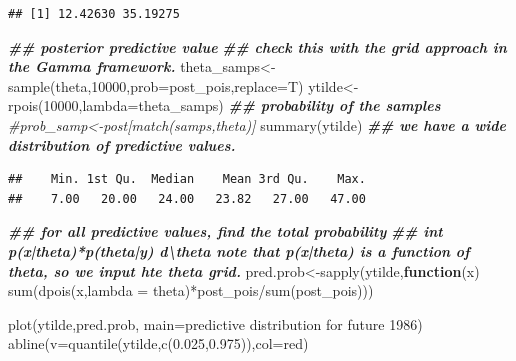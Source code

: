 \documentclass[
]{book}
\newenvironment{Shaded}{\begin{snugshade}}{\end{snugshade}}
\newcommand{\AttributeTok}[1]{\textcolor[rgb]{0.77,0.63,0.00}{#1}}
\newcommand{\CommentTok}[1]{\textcolor[rgb]{0.56,0.35,0.01}{\textit{#1}}}
\newcommand{\ControlFlowTok}[1]{\textcolor[rgb]{0.13,0.29,0.53}{\textbf{#1}}}
\newcommand{\DecValTok}[1]{\textcolor[rgb]{0.00,0.00,0.81}{#1}}
\newcommand{\DocumentationTok}[1]{\textcolor[rgb]{0.56,0.35,0.01}{\textbf{\textit{#1}}}}
\newcommand{\FloatTok}[1]{\textcolor[rgb]{0.00,0.00,0.81}{#1}}
\newcommand{\FunctionTok}[1]{\textcolor[rgb]{0.00,0.00,0.00}{#1}}
\newcommand{\NormalTok}[1]{#1}
\newcommand{\OtherTok}[1]{\textcolor[rgb]{0.56,0.35,0.01}{#1}}
\newcommand{\SpecialCharTok}[1]{\textcolor[rgb]{0.00,0.00,0.00}{#1}}
\newcommand{\StringTok}[1]{\textcolor[rgb]{0.31,0.60,0.02}{#1}}
\theoremstyle{definition}
\theoremstyle{definition}
\theoremstyle{definition}
\theoremstyle{definition}
\theoremstyle{remark}
\begin{document}
\begin{verbatim}
## [1] 12.42630 35.19275
\end{verbatim}

\begin{Shaded}
\begin{Highlighting}[]
\DocumentationTok{\#\# posterior predictive value}
   \DocumentationTok{\#\# check this with the grid approach in the Gamma framework.  }
\NormalTok{  theta\_samps}\OtherTok{\textless{}{-}}\FunctionTok{sample}\NormalTok{(theta,}\DecValTok{10000}\NormalTok{,}\AttributeTok{prob=}\NormalTok{post\_pois,}\AttributeTok{replace=}\NormalTok{T)}
\NormalTok{   ytilde}\OtherTok{\textless{}{-}}\FunctionTok{rpois}\NormalTok{(}\DecValTok{10000}\NormalTok{,}\AttributeTok{lambda=}\NormalTok{theta\_samps) }
 \DocumentationTok{\#\# probability of the samples }
 \CommentTok{\#prob\_samp\textless{}{-}post[match(samps,theta)]}
  \FunctionTok{summary}\NormalTok{(ytilde) }\DocumentationTok{\#\# we have a wide distribution of predictive values.}
\end{Highlighting}
\end{Shaded}

\begin{verbatim}
##    Min. 1st Qu.  Median    Mean 3rd Qu.    Max. 
##    7.00   20.00   24.00   23.82   27.00   47.00
\end{verbatim}

\begin{Shaded}
\begin{Highlighting}[]
\DocumentationTok{\#\# for all predictive values,  find the total probability  }
   \DocumentationTok{\#\# int p(x|theta)*p(theta|y) d\textbackslash{}theta  note that p(x|theta) is a function of theta, so we input hte theta grid.}
\NormalTok{ pred.prob}\OtherTok{\textless{}{-}}\FunctionTok{sapply}\NormalTok{(ytilde,}\ControlFlowTok{function}\NormalTok{(x) }\FunctionTok{sum}\NormalTok{(}\FunctionTok{dpois}\NormalTok{(x,}\AttributeTok{lambda =}\NormalTok{ theta)}\SpecialCharTok{*}\NormalTok{post\_pois}\SpecialCharTok{/}\FunctionTok{sum}\NormalTok{(post\_pois)))  }
  
 \FunctionTok{plot}\NormalTok{(ytilde,pred.prob, }\AttributeTok{main=}\StringTok{\textquotesingle{}predictive distribution for future 1986\textquotesingle{}}\NormalTok{)}
 \FunctionTok{abline}\NormalTok{(}\AttributeTok{v=}\FunctionTok{quantile}\NormalTok{(ytilde,}\FunctionTok{c}\NormalTok{(}\FloatTok{0.025}\NormalTok{,}\FloatTok{0.975}\NormalTok{)),}\AttributeTok{col=}\StringTok{\textquotesingle{}red\textquotesingle{}}\NormalTok{)}
\end{Highlighting}
\end{Shaded}
\end{document}

